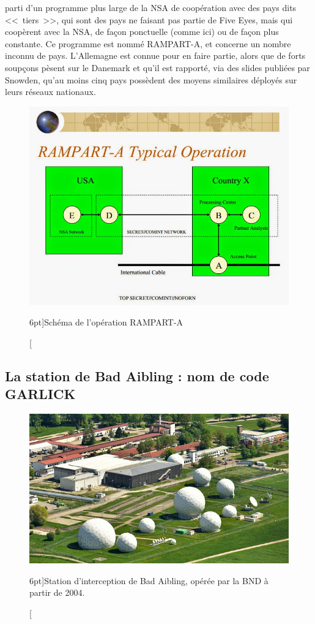 \newpage
{} parti d'un programme plus large de la NSA de
coopération avec des pays dits <<~tiers~>>, qui sont des pays ne faisant pas
partie de Five Eyes, mais qui coopèrent avec la NSA, de façon ponctuelle (comme
ici) ou de façon plus constante. Ce programme est nommé RAMPART-A, et concerne
un nombre inconnu de pays. L'Allemagne est connue pour en faire partie, alors
que de forts soupçons pèsent sur le Danemark\autocite{danemark} et qu'il est
rapporté, via des slides publiées par Snowden, qu'au moins cinq pays possèdent
des moyens similaires déployés sur leurs réseaux nationaux.

\begin{figure}
\includegraphics{rampart.jpg}
\caption[Schéma de l'opération RAMPART-A][6pt]{Schéma de l'opération RAMPART-A}
\label{fig:rampart}
\end{figure}


\newpage
\subsection{La station de Bad Aibling : nom de code GARLICK}

\begin{figure}
\includegraphics{ba1.jpg}
\caption[Station d'interception de Bad Aibling][6pt]{Station d'interception de
Bad Aibling, opérée par la BND à partir de 2004.}
\label{fig:ba1}
\end{figure}

